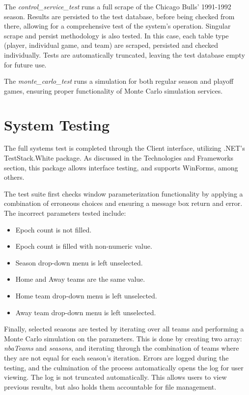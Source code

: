 \documentclass{thesis-ekf}
\theoremstyle{definition}
\theoremstyle{remark}
\begin{document}
The \emph{control\_service\_test} runs a full scrape of the Chicago Bulls' 1991-1992 season. Results are persisted to the test database, before being checked from there, allowing for a comprehensive test of the system's operation. Singular scrape and persist methodology is also tested. In this case, each table type (player, individual game, and team) are scraped, persisted and checked individually. Tests are automatically truncated, leaving the test database empty for future use.

The \emph{monte\_carlo\_test} runs a simulation for both regular season and playoff games, ensuring proper functionality of Monte Carlo simulation services.

\section{System Testing}
The full systems test is completed through the Client interface, utilizing .NET's TestStack.White package. As discussed in the Technologies and Frameworks section, this package allows interface testing, and supports WinForms, among others.

The test suite first checks window parameterization functionality by applying a combination of erroneous choices and ensuring a message box return and error. The incorrect parameters tested include:
\begin{itemize}
	\item Epoch count is not filled.
	\item Epoch count is filled with non-numeric value.
	\item Season drop-down menu is left unselected.
	\item Home and Away teams are the same value.
	\item Home team drop-down menu is left unselected.
	\item Away team drop-down menu is left unselected.
\end{itemize}

Finally, selected seasons are tested by iterating over all teams and performing a Monte Carlo simulation on the parameters. This is done by creating two array: \emph{nbaTeams} and \emph{seasons}, and iterating through the combination of teams where they are not equal for each season's iteration. Errors are logged during the testing, and the culmination of the process automatically opens the log for user viewing. The log is not truncated automatically. This allows users to view previous results, but also holds them accountable for file management.
\end{document}
